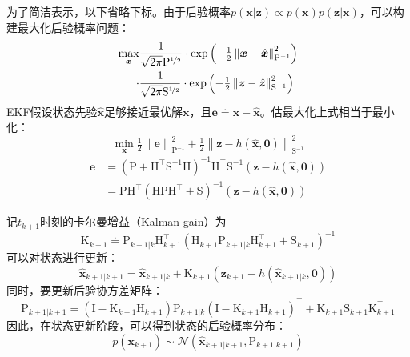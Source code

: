 为了简洁表示，以下省略下标。由于后验概率$p(\bm{x}|\bm{z}) \propto p(\bm{x})p(\bm{z}|\bm{x})$，可以构建最大化后验概率问题：
\begin{equation}
\begin{aligned}
    \max_{\bm{x}}
        &\frac{1}{\sqrt{2\pi}\mathrm{P}^{\nicefrac{1}{2}}}
        \cdot \exp \left( -\tfrac{1}{2}
            \left\| \bm{x}-\hat{\bm{x}} \right\|
            _{\mathrm{P}^{-1}}^2
        \right) \\
    \cdot
        &\frac{1}{\sqrt{2\pi}\mathrm{S}^{\nicefrac{1}{2}}}
        \cdot \exp \left( -\tfrac{1}{2}
            \left\| \bm{z}-\hat{\bm{z}} \right\|
            _{\mathrm{S}^{-1}}^2
        \right)
\end{aligned}
\end{equation}
EKF假设状态先验$\hat{\bm{x}}$足够接近最优解$\bm{x}$，且$\bm{e}\doteq\bm{x}-\hat{\bm{x}}$。估最大化上式相当于最小化：
\begin{equation}
    \min_{\bm{x}} \tfrac{1}{2}
        \left\| \bm{e} \right\|_{{\mathrm{P}}^{-1}}^2 +
    \tfrac{1}{2}
        \left\| \bm{z}-h(\hat{\bm{x}},\bm{0}) \right\|_{\mathrm{S}^{-1}}^2
\end{equation}
\begin{equation}
\begin{aligned}
    \bm{e} &=
    \left( \mathrm{P} + \mathrm{H}^\top\mathrm{S}^{-1}\mathrm{H} \right)^{-1}
    \mathrm{H}^\top\mathrm{S}^{-1}(\bm{z}-h(\hat{\bm{x}},\bm{0}))
    \\
    &= \mathrm{P}\mathrm{H}^\top
    \left( \mathrm{H}\mathrm{P}\mathrm{H}^\top + \mathrm{S} \right)^{-1}
    (\bm{z}-h(\hat{\bm{x}},\bm{0}))
\end{aligned}
\end{equation}

记$t_{k+1}$时刻的卡尔曼增益（Kalman gain）为
\begin{equation}
    \mathrm{K}_{k+1} \doteq
        \mathrm{P}_{k+1|k} \mathrm{H}_{k+1}^\top
        \left(
            \mathrm{H}_{k+1} \mathrm{P}_{k+1|k} \mathrm{H}_{k+1}^\top +
            \mathrm{S}_{k+1}
        \right)^{-1}
\end{equation}
可以对状态进行更新：
\begin{equation}
    \hat{\bm{x}}_{k+1|k+1} =
        \hat{\bm{x}}_{k+1|k} + \mathrm{K}_{k+1}
        (\bm{z}_{k+1}-h(\hat{\bm{x}}_{k+1|k},\bm{0}))
\end{equation}
同时，要更新后验协方差矩阵：
\begin{equation}
    \mathrm{P}_{k+1|k+1} =
        \left( \mathrm{I} - \mathrm{K}_{k+1} \mathrm{H}_{k+1} \right)
        \mathrm{P}_{k+1|k}
        \left( \mathrm{I} - \mathrm{K}_{k+1} \mathrm{H}_{k+1} \right)^\top +
        \mathrm{K}_{k+1} \mathrm{S}_{k+1} \mathrm{K}_{k+1}^\top
\end{equation}
因此，在状态更新阶段，可以得到状态的后验概率分布：
\begin{equation}
    p(\bm{x}_{k+1}) \sim \mathcal{N}(\hat{\bm{x}}_{k+1|k+1},\mathrm{P}_{k+1|k+1})
\end{equation}
